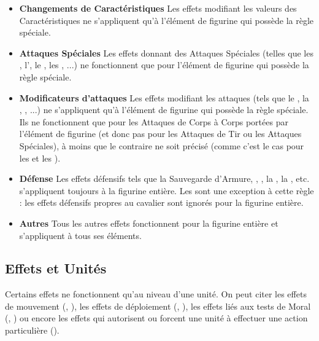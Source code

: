 \begin{itemize}[label={\textbullet}]
\item \textbf{Changements de Caractéristiques}\newline
Les effets modifiant les valeurs des Caractéristiques ne s'appliquent qu'à l'élément de figurine qui possède la règle spéciale.
\item \textbf{Attaques Spéciales}\newline
Les effets donnant des Attaques Spéciales (telles que les \grindingattacks{}, l'\breathweapon{}, le \stomp{}, les \impacthits{}, ...) ne fonctionnent que pour l'élément de figurine qui possède la règle spéciale.
\item \textbf{Modificateurs d'attaques}\newline
Les effets modifiant les attaques (tels que le , la \hatred{}, \armourpiercing{}, ...) ne s'appliquent qu'à l'élément de figurine qui possède la règle spéciale. Ils ne fonctionnent que pour les Attaques de Corps à Corps portées par l'élément de figurine (et donc pas pour les Attaques de Tir ou les Attaques Spéciales), à moins que le contraire ne soit précisé (comme c'est le cas pour les \poisonedattacks{} et les \magicalattacks{}).
\item \textbf{Défense}\newline
Les effets défensifs tels que la Sauvegarde d'Armure, \distracting{}, \fireborn{}, la \regeneration{}, la \wardsave{}, etc. s'appliquent toujours à la figurine entière.\newline
Les \riddenmonsters{} sont une exception à cette règle : les effets défensifs propres au cavalier sont ignorés pour la figurine entière.
\item \textbf{Autres}\newline
Tous les autres effets fonctionnent pour la figurine entière et s'appliquent à tous ses éléments.
\end{itemize}

\subsection{Effets et Unités}

Certains effets ne fonctionnent qu'au niveau d'une unité. On peut citer les effets de mouvement (\fastcavalry{}, \fly{}), les effets de déploiement (\vanguard{}, \scout{}), les effets liés aux tests de Moral (\unbreakable{}, \unstable{}) ou encore les effets qui autorisent ou forcent une unité à effectuer une action particulière (\frenzy{}).

